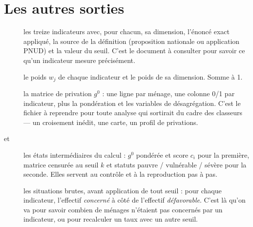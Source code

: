 \documentclass[11pt,a4paper]{article}
\begin{document}
\section{Les autres sorties}

\begin{description}
  \item[] les treize indicateurs avec, pour chacun, sa dimension, l'énoncé
    exact appliqué, la source de la définition (proposition nationale ou application PNUD) et la
    valeur du seuil. C'est le document à consulter pour savoir ce qu'un indicateur mesure
    précisément.

  \item[] le poids $w_j$ de chaque indicateur et le poids de sa dimension.
    Somme à 1.

  \item[] la matrice de privation $g^0$ : une ligne par
    ménage, une colonne 0/1 par indicateur, plus la pondération et les variables de désagrégation.
    C'est le fichier à reprendre pour toute analyse qui sortirait du cadre des classeurs --- un
    croisement inédit, une carte, un profil de privations.

  \item[ et ] les états
    intermédiaires du calcul : $g^0$ pondérée et score $c_i$ pour la première, matrice censurée au
    seuil $k$ et statuts pauvre / vulnérable / sévère pour la seconde. Elles servent au contrôle et
    à la reproduction pas à pas.

  \item[] les situations brutes, avant
    application de tout seuil : pour chaque indicateur, l'effectif \emph{concerné} à côté de
    l'effectif \emph{défavorable}. C'est là qu'on va pour savoir combien de ménages n'étaient pas
    concernés par un indicateur, ou pour recalculer un taux avec un autre seuil.
\end{description}
\end{document}
